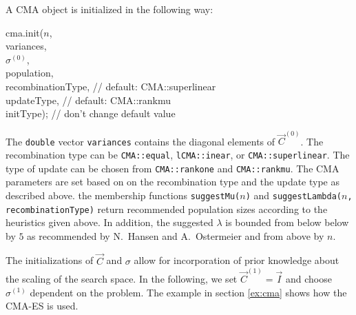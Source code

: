 A CMA object is initialized in the following way:
\begin{shortlisting}
cma.init($n$,\\
         variances, \\
         $\sigma^{(0)}$, \\
         population, \\
         recombinationType,  // {\rm default:} CMA::superlinear  \\
         updateType,         // {\rm default:} CMA::rankmu \\
         initType);          // {\rm don't change default value} \\
\end{shortlisting}
The \texttt{double} vector \texttt{variances} contains the diagonal
elements of $\vec{C}^{(0)}$. The recombination type can be
\texttt{CMA::equal}, \texttt{lCMA::inear}, or
\texttt{CMA::superlinear}.  The type of update can be chosen from
\texttt{CMA::rankone} and \texttt{CMA::rankmu}. The CMA parameters are
set based on on the recombination type and the update type as
described above.  the membership functions \texttt{suggestMu($n$)} and
\texttt{suggestLambda($n$, recombinationType)} return recommended
population sizes according to the heuristics given above.  In
addition, the suggested $\lambda$ is bounded from below below by $5$
as recommended by N.~Hansen and A.~Ostermeier and from above by $n$.



 The initializations of ${\vec{C}}$ and
$\sigma$ allow for incorporation of prior knowledge about the scaling
of the search space.  In the following, we set
${\vec{C}}^{(1)}=\vec{I}$ and choose $\sigma^{(1)}$ dependent on the
problem.
The  example in section \ref{ex:cma} shows how the CMA-ES is used.





